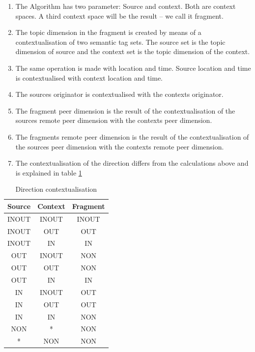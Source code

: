 \begin{enumerate}
    \item The Algorithm has two parameter: Source and context. Both are context spaces. A third context space will be the result -- we call it fragment.
\item The topic dimension in the fragment is created by means of a contextualisation of two semantic tag sets. The source set is the topic dimension of source and the context set is the topic dimension of the context. 
\item The same operation is made with location and time. Source location and time is contextualised with context location and time.
\item The sources originator is contextualised with the contexts originator.
\item
The fragment peer dimension is the result of the contextualisation of the sources remote peer dimension with the contexts peer dimension.
\item
The fragments remote peer dimension is the result of the contextualisation of the sources peer dimension with the contexts remote peer dimension.
\item
The contextualisation of the direction differs from the calculations above and is explained in table \ref{tab:directionCalculation}
\end{enumerate}

\begin{table}[t]
\centering
\begin{tabular}{|c|c|c|}
\hline
Source & Context & Fragment \\
\hline
INOUT & INOUT & INOUT \\
\hline
INOUT & OUT & OUT \\
\hline
INOUT & IN & IN \\
\hline
OUT & INOUT & NON \\
\hline
OUT & OUT & NON \\
\hline
OUT & IN & IN \\
\hline
IN & INOUT & OUT \\
\hline
IN & OUT & OUT \\
\hline
IN & IN & NON \\
\hline
NON & * & NON \\
\hline
* & NON & NON \\
\hline
\end{tabular}
\caption{Direction contextualisation}
\label{tab:directionCalculation}
\end{table}

